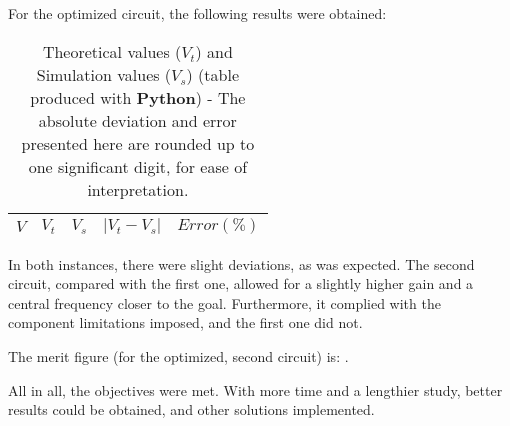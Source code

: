 For the optimized circuit, the following results were obtained:

\begin{table}[H]
  \centering
  \begin{tabular}{|c|c|c|c|c|}
    \hline
        $V$ & $V_t$ & $V_s$ & $|V_t-V_s|$ & $Error (\%)$ \\
        \hline
        \hline
        
        \hline
  \end{tabular}
  \caption{Theoretical values ($V_t$) and Simulation values ($V_s$) (table produced with {\bf Python})  - The absolute deviation and error presented here are rounded up to one significant digit, for ease of interpretation.}
  \label{error2_res}
\end{table}

In both instances, there were slight deviations, as was expected. The second circuit, compared with the first one, allowed for a slightly higher gain and a central frequency closer to the goal. Furthermore, it complied with the component limitations imposed, and the first one did not.

The merit figure (for the optimized, second circuit) is: .

All in all, the objectives were met. With more time and a lengthier study, better results could be obtained, and other solutions implemented.
